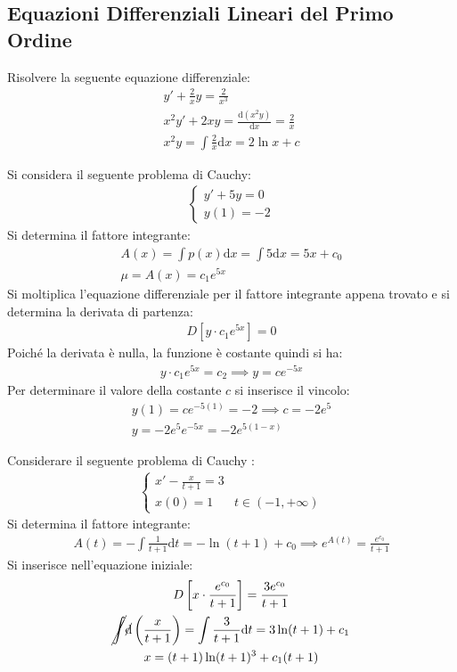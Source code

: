 \documentclass{article}
\newcommand{\df}{\mathrm{d}}
\numberwithin{equation}{subsection}
\begin{document}
\subsection{Equazioni Differenziali Lineari del Primo Ordine}

Risolvere la seguente equazione differenziale:
\begin{gather*}
    y'+\displaystyle\frac{2}{x}y=\frac{2}{x^3}\\
    x^2y'+2xy=\displaystyle\frac{\df (x^2y)}{\df x}=\frac{2}{x}\\
    \displaystyle x^2y=\int \frac{2}{x}\df x=2\ln x + c
\end{gather*}


Si considera il seguente problema di Cauchy:
\begin{gather*}
    \begin{cases}
        y'+5y=0\\
        y(1)=-2
    \end{cases}
\end{gather*}
Si determina il fattore integrante:
\begin{gather*}
    A(x)=\displaystyle\int p(x)\df x=\int5\df x=5x+c_0\\
    \mu={A(x)}=c_1e^{5x}
\end{gather*}
Si moltiplica l'equazione differenziale per il fattore integrante appena trovato e si determina la derivata di partenza:
\begin{gather*}
    D[y\cdot c_1e^{5x}]=0
\end{gather*}
Poiché la derivata è nulla, la funzione è costante quindi si ha:
\begin{gather*}
    y\cdot c_1e^{5x}=c_2\implies y=ce^{-5x}
\end{gather*}
Per determinare il valore della costante $c$ si inserisce il vincolo:
\begin{gather*}
    y(1)=ce^{-5(1)}=-2\implies c=-2e^5\\
    y=-2e^5e^{-5x}=-2e^{5(1-x)}
\end{gather*}


Considerare il seguente problema di Cauchy :
\begin{gather*}
    \begin{cases}
        \displaystyle x'-\frac{x}{t+1}=3\\
        x(0)=1 & t\in(-1,+\infty)
    \end{cases}
\end{gather*}
Si determina il fattore integrante:
\begin{gather*}
    A(t)=\displaystyle-\int\frac{1}{t+1}\df t=-\ln(t+1)+c_0\implies e^{A(t)}=\frac{e^{c_0}}{t+1}
\end{gather*}
Si inserisce nell'equazione iniziale:
\begin{gather*}
    D\left[x\cdot\frac{e^{c_0}}{t+1}\right]=\frac{3e^{c_0}}{t+1}\\
    \displaystyle\cancel{\int}\cancel{\df}\left(\frac{x}{t+1}\right)=\int \frac{3}{t+1}\df t=3\ln(t+1)+c_1\\
    x=(t+1)\ln(t+1)^3+c_1(t+1)
\end{gather*}
\end{document}

